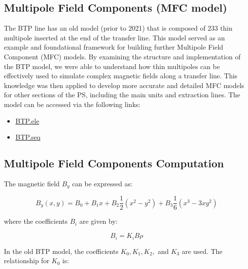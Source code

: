 


\subsection{Multipole Field Components (MFC model)}
\label{BTP Stray Elements}

The BTP line has an old model (prior to 2021) that is composed of 233 thin multipole inserted at the end of the transfer line. This model served as an example and foundational framework for building further Multipole Field Component (MFC) models. By examining the structure and implementation of the BTP model, we were able to understand how thin multipoles can be effectively used to simulate complex magnetic fields along a transfer line. This knowledge was then applied to develop more accurate and detailed MFC models for other sections of the PS, including the main units and extraction lines. The model can be accessed via the following links:

\begin{itemize}
    \item \href{https://gitlab.cern.ch/acc-models/acc-models-tls/-/blob/2021/psb_extraction/btp/BTP.ele}{BTP.ele}
    \item \href{https://gitlab.cern.ch/acc-models/acc-models-tls/-/blob/2021/psb_extraction/btp/BTP.seq}{BTP.seq}
\end{itemize}



\subsection{Multipole Field Components Computation}

The magnetic field \( B_y \) can be expressed as:

\[
B_{y}(x,y) = B_{0} + B_{1}x + B_{2}\frac{1}{2}(x^{2}-y^{2}) + B_{3}\frac{1}{6}(x^{3}-3xy^{2})
\]

where the coefficients \( B_i \) are given by:

\[
B_{i} = K_{i}B\rho
\]

In the old BTP model, the coefficients \( K_{0}, K_{1}, K_{2}, \) and \( K_{3} \) are used. The relationship for \( K_{0} \) is:

